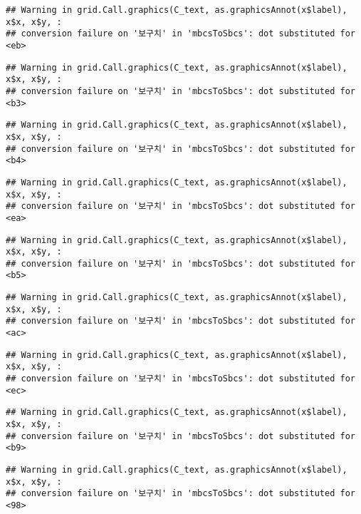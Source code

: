 \documentclass[
]{article}
\begin{document}
\begin{verbatim}
## Warning in grid.Call.graphics(C_text, as.graphicsAnnot(x$label), x$x, x$y, :
## conversion failure on '보구치' in 'mbcsToSbcs': dot substituted for <eb>
\end{verbatim}

\begin{verbatim}
## Warning in grid.Call.graphics(C_text, as.graphicsAnnot(x$label), x$x, x$y, :
## conversion failure on '보구치' in 'mbcsToSbcs': dot substituted for <b3>
\end{verbatim}

\begin{verbatim}
## Warning in grid.Call.graphics(C_text, as.graphicsAnnot(x$label), x$x, x$y, :
## conversion failure on '보구치' in 'mbcsToSbcs': dot substituted for <b4>
\end{verbatim}

\begin{verbatim}
## Warning in grid.Call.graphics(C_text, as.graphicsAnnot(x$label), x$x, x$y, :
## conversion failure on '보구치' in 'mbcsToSbcs': dot substituted for <ea>
\end{verbatim}

\begin{verbatim}
## Warning in grid.Call.graphics(C_text, as.graphicsAnnot(x$label), x$x, x$y, :
## conversion failure on '보구치' in 'mbcsToSbcs': dot substituted for <b5>
\end{verbatim}

\begin{verbatim}
## Warning in grid.Call.graphics(C_text, as.graphicsAnnot(x$label), x$x, x$y, :
## conversion failure on '보구치' in 'mbcsToSbcs': dot substituted for <ac>
\end{verbatim}

\begin{verbatim}
## Warning in grid.Call.graphics(C_text, as.graphicsAnnot(x$label), x$x, x$y, :
## conversion failure on '보구치' in 'mbcsToSbcs': dot substituted for <ec>
\end{verbatim}

\begin{verbatim}
## Warning in grid.Call.graphics(C_text, as.graphicsAnnot(x$label), x$x, x$y, :
## conversion failure on '보구치' in 'mbcsToSbcs': dot substituted for <b9>
\end{verbatim}

\begin{verbatim}
## Warning in grid.Call.graphics(C_text, as.graphicsAnnot(x$label), x$x, x$y, :
## conversion failure on '보구치' in 'mbcsToSbcs': dot substituted for <98>
\end{verbatim}
\end{document}
